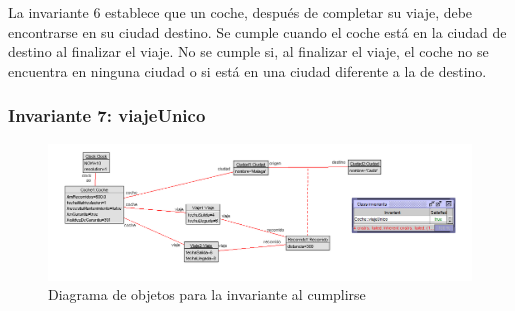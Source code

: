\documentclass[12pt.a4paper]{article}
\begin{document}
La invariante 6 establece que un coche, después de completar su viaje, debe encontrarse en su ciudad destino. Se cumple cuando el coche está en la ciudad de destino al finalizar el viaje. No se cumple si, al finalizar el viaje, el coche no se encuentra en ninguna ciudad o si está en una ciudad diferente a la de destino.

\subsubsection{Invariante 7: viajeUnico}
    \begin{figure}[H]
         \centering
         \includegraphics[width=1\linewidth]{Soils/7.png}
         \caption{Diagrama de objetos para la invariante al cumplirse}
         \label{Diagrama_cumplimiento}
    \end{figure}
\end{document}
